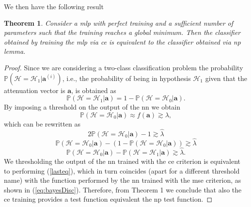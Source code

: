 \documentclass[draftcls,onecolumn,12pt]{IEEEtran}
\newtheorem{theorem}{Theorem}
\begin{document}
We then have the following result
\begin{theorem}
\label{th:nn_np2}
Consider a \ac{mlp} with perfect training and a sufficient number of parameters such that the training reaches a global minimum. Then the classifier obtained by training the \ac{mlp} via \ac{ce} is equivalent to the classifier obtained via \ac{np} lemma.
\end{theorem}
\begin{proof}
Since we are considering a two-class classification problem the probability $\mathbb{P}(\mathcal{H} =\mathcal{H}_1|\bm{a}^{(i)})$, i.e., the probability of being in hypothesis $\mathcal{H}_1$ given that the attenuation vector is $\bm{a}$, is obtained as
\begin{equation}
    \mathbb{P}(\mathcal{H} = \mathcal{H}_1|\bm{a} ) = 1- \mathbb{P}(\mathcal{H} = \mathcal{H}_0|\bm{a} ).
\end{equation}
By imposing a threshold on the output of the \ac{nn} we obtain
\begin{equation}
    \mathbb{P}(\mathcal{H}=\mathcal{H}_0|\bm{a}) \approx  f(\bm{a}) \gtrsim \lambda,
\end{equation}
which can be rewritten as
\begin{equation}
    2\mathbb{P}(\mathcal{H}=\mathcal{H}_0|\bm{a} )-1 \gtrsim \hat{\lambda}
\end{equation}
\begin{equation}
    \mathbb{P}(\mathcal{H}=\mathcal{H}_0|\bm{a} )-(1-\mathbb{P}(\mathcal{H}=\mathcal{H}_0|\bm{a} )) \gtrsim \hat{\lambda}
\end{equation}
\begin{equation}
\label{lasteq}
    \mathbb{P}(\mathcal{H}=\mathcal{H}_0|\bm{a} )-\mathbb{P}(\mathcal{H}=\mathcal{H}_1|\bm{a} ) \gtrsim \hat{\lambda}.
\end{equation}
We thresholding the output of the \ac{nn} trained with the \ac{ce} criterion is equivalent to performing (\ref{lasteq}), which in turn coincides (apart for a different threshold name) with the function performed by the \ac{nn} trained with the \ac{mse} criterion, as shown in (\ref{eq:bayesDisc}). Therefore, from Theorem 1 we conclude that also the \ac{ce} training provides a test function equivalent the \ac{np} test function.
\end{proof}
\end{document}
